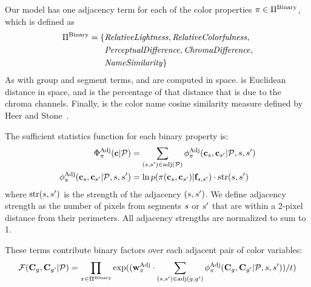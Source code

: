 
Our model has one adjacency term for each of the color properties $ \pi \in \Pi^{\textrm{Binary}}$, which is defined as
\begin{align*}
\Pi^{\textrm{Binary}} = \{ &\text{\emph{RelativeLightness}}, \text{\emph{RelativeColorfulness}}, \\
                  &\text{\emph{PerceptualDifference}}, \text{\emph{ChromaDifference}}, \\
                  &\text{\emph{NameSimilarity}} \}
\end{align*}
As with group and segment terms,  and  are computed in \lab space.  is Euclidean distance in \lab space, and  is the percentage of that distance that is due to the chroma channels. Finally,  is the color name cosine similarity measure defined by Heer and Stone~.

The sufficient statistics function for each binary property is:
 \begin{align*}
 \Phi^{\textrm{Adj}}_\pi(\mathbf{c} | \mathcal{P}) &= \sum_{(s, {s^{\prime}}) \in \text{adj}(\mathcal{P})} \phi^{\textrm{Adj}}_\pi(\mathbf{c}_s, \mathbf{c}_{s^{\prime}} | \mathcal{P}, s, {s^{\prime}}) \\
 \phi^{\textrm{Adj}}_\pi(\mathbf{c}_s, \mathbf{c}_{s^{\prime}} | \mathcal{P}, s, {s^{\prime}}) &= \ln p( \pi( \mathbf{c}_s, \mathbf{c}_{s^{\prime}} ) | \mathbf{f}_{s, {s^{\prime}}} ) \cdot \text{str}(s, {s^{\prime}})
\end{align*}
where $\text{str}(s,{s^{\prime}})$ is the strength of the adjacency $(s,{s^{\prime}})$. We define adjacency strength as the number of pixels from segments $s$ or ${s^{\prime}}$ that are within a 2-pixel distance from their perimeters. All adjacency strengths are normalized to sum to 1.  

These terms contribute binary factors over each adjacent pair of color variables:
\begin{equation*}
 \mathcal{F}(\mathbf{C}_g, \mathbf{C}_{g^{\prime}} | \mathcal{P}) = \prod_{\pi \in \Pi^{\textrm{Binary}}} \exp( (\mathbf{w}^{\textrm{Adj}}_\pi \cdot \sum_{(s, {s^{\prime}}) \in \text{adj}(g, {g^{\prime}})} \phi^{\textrm{Adj}}_\pi( \mathbf{C}_g, \mathbf{C}_{g^{\prime}} | \mathcal{P}, s, {s^{\prime}})) / t) 
\end{equation*}

